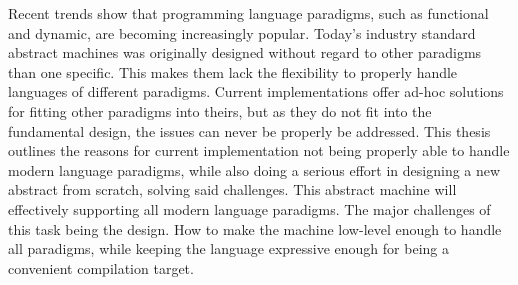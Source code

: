 
Recent trends show that programming language paradigms, such as functional and
dynamic, are becoming increasingly popular. Today's industry standard abstract
machines was originally designed without regard to other paradigms than one
specific. This makes them lack the flexibility to properly handle languages of
different paradigms. Current implementations offer ad-hoc solutions for fitting
other paradigms into theirs, but as they do not fit into the fundamental design,
the issues can never be properly be addressed. This thesis outlines the reasons
for current implementation not being properly able to handle modern language
paradigms, while also doing a serious effort in designing a new abstract from
scratch, solving said challenges. This abstract machine will effectively
supporting all modern language paradigms. The major challenges of this task
being the design. How to make the machine low-level enough to handle all
paradigms, while keeping the language expressive enough for being a convenient
compilation target.

